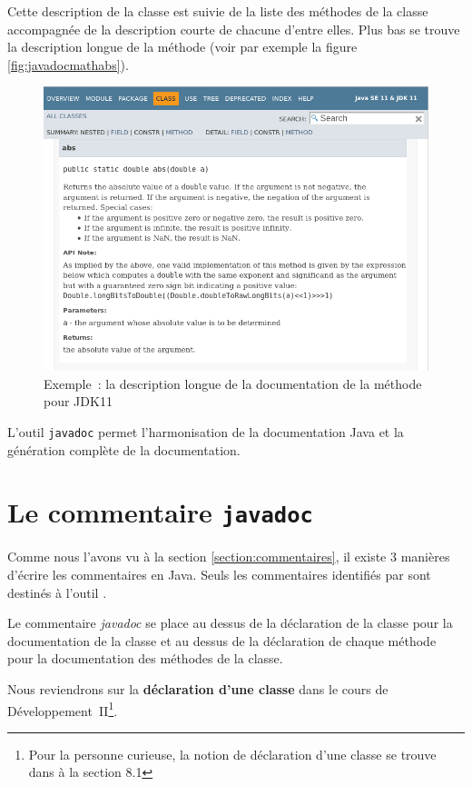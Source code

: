 Cette description de la classe est suivie de la liste des méthodes de la classe
accompagnée de la description courte de chacune d'entre elles. Plus bas se
trouve la description longue de la méthode (voir par exemple la figure
\vref{fig:javadocmathabs}).

\begin{figure}[h]
	\centering
	\includegraphics[width=.9\linewidth]{images/javadoc-abs.png}
	\caption{Exemple~: la description longue de la documentation de la méthode  pour JDK11}
	\label{fig:javadocmathabs}
\end{figure}


L'outil \texttt{javadoc} permet l'harmonisation de la documentation Java et la
génération complète de la documentation.  


\section{Le commentaire \texttt{javadoc}}

Comme nous l'avons vu à la section \vref{section:commentaires}, il existe
3 manières d'écrire les commentaires en Java. Seuls les commentaires identifiés
par \pc{/** */} sont destinés à l'outil . 

Le commentaire \textit{javadoc} se place au dessus de la déclaration de la
classe pour la documentation de la classe et au dessus de la déclaration de
chaque méthode pour la documentation des méthodes de la classe. 

Nous reviendrons sur la \textbf{déclaration d'une classe} dans le cours de
Développement~II\footnote{Pour la personne curieuse, la notion de déclaration
d'une classe se trouve dans \cite{jls9} à la section 8.1 }. 

